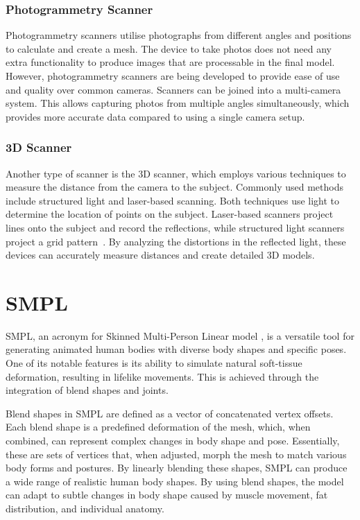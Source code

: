 \subsubsection{Photogrammetry Scanner}
Photogrammetry scanners utilise photographs from different angles and positions to calculate and create a mesh. The device to take photos does not need any extra functionality to produce images that are processable in the final model. However, photogrammetry scanners are being developed to provide ease of use and quality over common cameras. Scanners can be joined into a multi-camera system. This allows capturing photos from multiple angles simultaneously, which provides more accurate data compared to using a single camera  setup.
\subsubsection{3D Scanner}
Another type of scanner is the 3D scanner, which employs various techniques to measure the distance from the camera to the subject. Commonly used methods include structured light and laser-based scanning. Both techniques use light to determine the location of points on the subject. Laser-based scanners project lines onto the subject and record the reflections, while structured light scanners project a grid pattern~\cite{structuredLight}. By analyzing the distortions in the reflected light, these devices can accurately measure distances and create detailed 3D models.

\section{SMPL}
\label{smpl}
SMPL, an acronym for Skinned Multi-Person Linear model \cite{smpl}, is a versatile tool for generating animated human bodies with diverse body shapes and specific poses. One of its notable features is its ability to simulate natural soft-tissue deformation, resulting in lifelike movements. This is achieved through the integration of blend shapes and joints.

Blend shapes in SMPL are defined as a vector of concatenated vertex offsets. Each blend shape is a predefined deformation of the mesh, which, when combined, can represent complex changes in body shape and pose. Essentially, these are sets of vertices that, when adjusted, morph the mesh to match various body forms and postures. By linearly blending these shapes, SMPL can produce a wide range of realistic human body shapes. By using blend shapes, the model can adapt to subtle changes in body shape caused by muscle movement, fat distribution, and individual anatomy.

